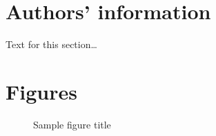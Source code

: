 \documentclass{bmcart}\usepackage[]{graphicx}\usepackage[]{color}
\begin{document}
\begin{backmatter}
\section*{Authors' information}%
Text for this section\ldots






\section*{Figures}
  \begin{figure}[h!]
  \caption{Sample figure title}
\end{figure}


\end{backmatter}
\end{document}
